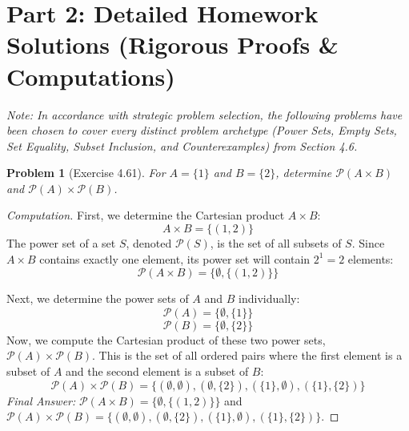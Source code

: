 \documentclass[11pt]{article}
\newtheorem{problem}{Problem}
\newcommand{\powerset}{\mathcal{P}}
\begin{document}
\section{Part 2: Detailed Homework Solutions (Rigorous Proofs \& Computations)}

\textit{Note: In accordance with strategic problem selection, the following problems have been chosen to cover every distinct problem archetype (Power Sets, Empty Sets, Set Equality, Subset Inclusion, and Counterexamples) from Section 4.6.}

\begin{problem}[Exercise 4.61]
For $A = \{1\}$ and $B = \{2\}$, determine $\powerset(A \times B)$ and $\powerset(A) \times \powerset(B)$.
\end{problem}
\begin{proof}[Computation]
First, we determine the Cartesian product $A \times B$:
\[ A \times B = \{(1, 2)\} \]
The power set of a set $S$, denoted $\powerset(S)$, is the set of all subsets of $S$. Since $A \times B$ contains exactly one element, its power set will contain $2^1 = 2$ elements:
\[ \powerset(A \times B) = \{\emptyset, \{(1, 2)\}\} \]

Next, we determine the power sets of $A$ and $B$ individually:
\[ \powerset(A) = \{\emptyset, \{1\}\} \]
\[ \powerset(B) = \{\emptyset, \{2\}\} \]
Now, we compute the Cartesian product of these two power sets, $\powerset(A) \times \powerset(B)$. This is the set of all ordered pairs where the first element is a subset of $A$ and the second element is a subset of $B$:
\[ \powerset(A) \times \powerset(B) = \{ (\emptyset, \emptyset), (\emptyset, \{2\}), (\{1\}, \emptyset), (\{1\}, \{2\}) \} \]
\textit{Final Answer:} $\powerset(A \times B) = \{\emptyset, \{(1, 2)\}\}$ and $\powerset(A) \times \powerset(B) = \{ (\emptyset, \emptyset), (\emptyset, \{2\}), (\{1\}, \emptyset), (\{1\}, \{2\}) \}$.
\end{proof}
\end{document}
